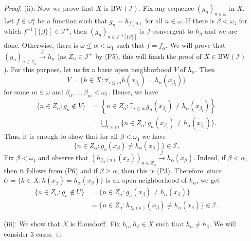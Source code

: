 \documentclass{amsart}
\theoremstyle{plain}
\theoremstyle{definition}
\theoremstyle{remark}
\newcommand{\cI}{\mathcal{I}}
\newcommand{\I}{\cI}
\newcommand{\BW}{\mathrm{BW}}
\begin{document}
\begin{proof}
(ii): Now we prove that $X$ is $\BW(\I)$. Fix any sequence $(g_n)_{n \in \omega}$ in $X$. Let $f\in \omega_1^\omega$ be a function such that $g_n=h_{f(n)}$ for all $n \in \omega$. If there is $\beta<\omega_1$ for which $f^{-1}[\{\beta\}] \in \I^+$, then $(g_n)_{n\in f^{-1}[\{\beta\}]}$ is $\I$-convergent to $h_{\beta}$ and we are done. Otherwise, there is $\omega \leq \alpha < \omega_1$ such that $f=f_\alpha$. We will prove that $(g_n)_{n \in Z_\alpha} \overset{\I}{\longrightarrow}h_\alpha$ (as $Z_\alpha\in\I^+$ by (P5), this will finish the proof of $X\in\BW(\I)$). For this purpose, let us fix a basic open neighborhood $V$ of $h_\alpha$. Then $$V=\{h \in X: \forall_{i \leq m} h(x_{\beta_i})=h_\alpha(x_{\beta_i})\}$$ for some $m \in \omega$ and $\beta_0, \ldots,\beta_m < \omega_1$. Hence, we have 
\begin{equation*}
    \begin{split}
        \{n \in Z_\alpha: g_n\notin V\}
        &
         =\left\{n \in Z_\alpha: \exists_{i \leq m}g_n(x_{\beta_i})\neq h_\alpha(x_{\beta_i})\right\}
        \\&
        =\bigcup_{i\leq m}\{n \in Z_\alpha:g_n(x_{\beta_i})\neq h_\alpha(x_{\beta_i}) \}\textrm{.}
 \end{split}
 \end{equation*} 
Thus, it is enough to show that for all $\beta<\omega_1$ we have $$\{n \in Z_\alpha: g_n(x_{\beta})\neq h_\alpha(x_{\beta})\}\in \I \textrm{.}$$ Fix $\beta<\omega_1$ and observe that $(h_{f_\alpha(n)}(x_{\beta}))_{n \in Z_\alpha} \overset{\I}{\longrightarrow}h_\alpha(x_{\beta})$. Indeed, if $\beta<\alpha$, then it follows from (P6) and if $\beta \geq \alpha$, then this is (P3). Therefore, since $U=\{h\in X: h(x_\beta)=h_\alpha(x_{\beta})\}$ is an open neighborhood of $h_\alpha$, we get
\begin{equation*}
    \begin{split}
        \{n\in Z_\alpha:g_n\notin U\}
        &
         =\{n \in Z_\alpha: g_n(x_{\beta})\neq h_\alpha(x_{\beta})\}
        \\&
        =\{n \in Z_\alpha: h_{f_\alpha(n)}(x_{\beta})\neq h_\alpha(x_{\beta})\}\in \I\textrm{.}
 \end{split}
 \end{equation*} 

\medskip

(iii): We show that $X$ is Hausdorff. Fix $h_\alpha,h_\beta\in X$ such that $h_\alpha\neq h_\beta$. We will consider 3 cases.

\smallskip


\end{proof}
\end{document}
